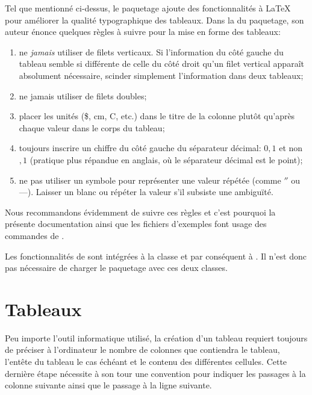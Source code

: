 Tel que mentionné ci-dessus, le paquetage  ajoute des
fonctionnalités à {\LaTeX} pour améliorer la qualité typographique des
tableaux. Dans la %
du paquetage, son auteur énonce quelques règles à suivre pour la mise
en forme des tableaux:
\begin{enumerate}
\item ne \emph{jamais} utiliser de filets verticaux. Si l'information
  du côté gauche du tableau semble si différente de celle du côté
  droit qu'un filet vertical apparaît absolument nécessaire, scinder
  simplement l'information dans deux tableaux;
\item ne jamais utiliser de filets doubles;
\item placer les unités (\$, cm, {\textdegree}C, etc.) dans le titre
  de la colonne plutôt qu'après chaque valeur dans le corps du
  tableau;
\item toujours inscrire un chiffre du côté gauche du séparateur
  décimal: $0,1$ et non $,1$ (pratique plus répandue en anglais, où le
  séparateur décimal est le point);
\item ne pas utiliser un symbole pour représenter une valeur
  répétée (comme $''$ ou ---). Laisser un blanc ou répéter la
  valeur s'il subsiste une ambiguïté.
\end{enumerate}

Nous recommandons évidemment de suivre ces règles et c'est pourquoi la
présente documentation ainsi que les fichiers d'exemples font usage
des commandes de .

Les fonctionnalités de  sont intégrées à la classe
 et par conséquent à . Il n'est donc pas
nécessaire de charger le paquetage avec ces deux classes.



\section{Tableaux}
\label{sec:tableaux:tableaux}

Peu importe l'outil informatique utilisé, la création d'un tableau
requiert toujours de préciser à l'ordinateur le nombre de colonnes que
contiendra le tableau, l'entête du tableau le cas échéant et le contenu
des différentes cellules. Cette dernière étape nécessite à son tour
une convention pour indiquer les passages à la colonne suivante
ainsi que le passage à la ligne suivante.

